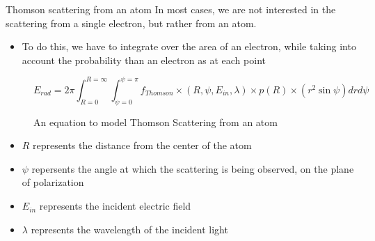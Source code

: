 \documentclass[aspectratio=169]{beamer}
\begin{document}
\begin{frame}[t]{Thomson scattering from an atom}
	In most cases, we are not interested in the scattering from a single electron, but rather from an atom.
	
	\begin{itemize}
		\item To do this, we have to integrate over the area of an electron, while taking into account the probability than an electron as at each point
	\end{itemize}
	
	\begin{figure}
		$$ E_{rad} = 2 \pi  \int_{R=0}^{R=\infty} \int_{\psi = 0}^{\psi = \pi} f_{Thomson} \times (R, \psi, E_{in}, \lambda) \times p(R) \times (r^2 \sin \psi) dr d\psi$$
		\caption{An equation to model Thomson Scattering from an atom}
	\end{figure}		
	
	\begin{scriptsize}
	\begin{itemize}
		\item $R$ represents the distance from the center of the atom
		\item $\psi$ repersents the angle at which the scattering is being observed, on the plane of polarization
		\item $E_{in}$ represents the incident electric field
		\item $\lambda$ represents the wavelength of the incident light
	\end{itemize}
	\end{scriptsize}
	
\end{frame}				
	
\end{document}
